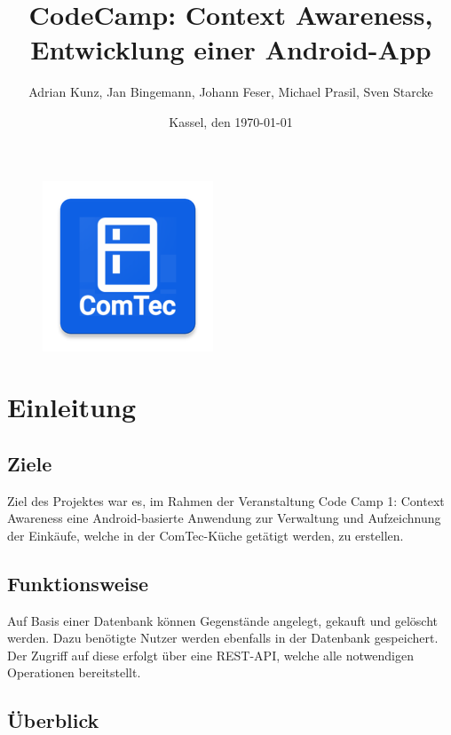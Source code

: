 \documentclass{scrartcl}
\title{CodeCamp: Context Awareness, Entwicklung einer Android-App}
\author{Adrian Kunz, Jan Bingemann, Johann Feser, Michael Prasil, Sven Starcke}
\date{Kassel, den \today}
\begin{document}
	\maketitle
	\vspace*{10ex}
	\begin{figure}[!h]
		\centering
		\includegraphics{./figures/title.png}
	\end{figure}

	\newpage

	\tableofcontents
	\newpage

	\section{Einleitung}\label{sec:einleitung}

	\subsection{Ziele}\label{subsec:ziele}

	Ziel des Projektes war es, im Rahmen der Veranstaltung \glqq Code Camp 1: Context Awareness\grqq{} eine Android-basierte Anwendung zur Verwaltung und Aufzeichnung der Einkäufe, welche in der ComTec-Küche getätigt werden, zu erstellen.

	\subsection{Funktionsweise}\label{subsec:funktionsweise}

	Auf Basis einer Datenbank können Gegenstände angelegt, gekauft und gelöscht werden.
	Dazu benötigte Nutzer werden ebenfalls in der Datenbank gespeichert.
	Der Zugriff auf diese erfolgt über eine REST-API, welche alle notwendigen Operationen bereitstellt.

	\subsection{Überblick}\label{subsec:überblick}
\end{document}
